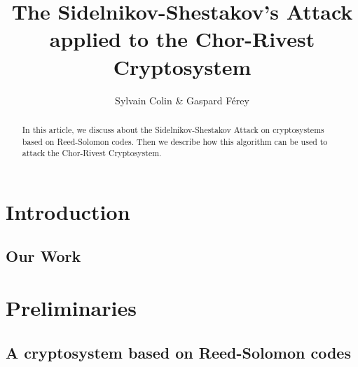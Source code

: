 \documentclass[12pt,a4paper,titlepage]{article}
\author{Sylvain Colin \& Gaspard Férey}
\title{The Sidelnikov-Shestakov's Attack applied to the Chor-Rivest Cryptosystem}
\begin{document}
\maketitle
\tableofcontents
\newpage




\begin{abstract}

In this article, we discuss about the Sidelnikov-Shestakov Attack on cryptosystems based on Reed-Solomon codes. Then we describe how this algorithm can be used to attack the Chor-Rivest Cryptosystem.



\end{abstract}


\section{Introduction}
\label{sec:intro}


\subsection{Our Work}


\section{Preliminaries}
\label{sec:defnot}


\subsection{A cryptosystem based on Reed-Solomon codes}
\end{document}
